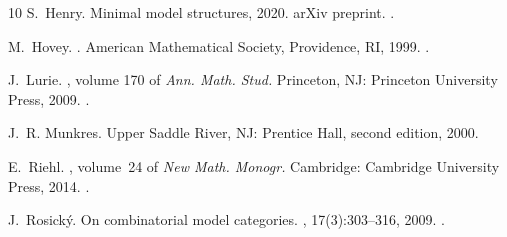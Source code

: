 \documentclass[12pt,a4paper]{amsart}
\theoremstyle{definition}
\begin{document}
\begin{thebibliography}{10}
	S.~Henry.
	\newblock Minimal model structures, 2020.
	\newblock arXiv preprint.
	\newblock \href {https://doi.org/10.48550/arXiv.2011.13408}
	{}.
	
	M.~Hovey.
	.
	\newblock American Mathematical Society, Providence, RI, 1999.
	\newblock \href {https://doi.org/10.1090/surv/063}
	{}.
	
	J.~Lurie.
	, volume 170 of {\em Ann. Math.
		Stud.}
	\newblock Princeton, NJ: Princeton University Press, 2009.
	\newblock \href {https://doi.org/10.1515/9781400830558}
	{}.
	
	J.~R. Munkres.
	\newblock Upper Saddle River, NJ: Prentice Hall, second edition, 2000.
	
	E.~Riehl.
	, volume~24 of {\em New Math.
		Monogr.}
	\newblock Cambridge: Cambridge University Press, 2014.
	\newblock \href {https://doi.org/10.1017/CBO9781107261457}
	{}.
	
	J.~Rosick{\'y}.
	\newblock On combinatorial model categories.
	, 17(3):303--316, 2009.
	\newblock \href {https://doi.org/10.1007/s10485-008-9171-2}
	{}.
	
\end{thebibliography}


%
%
\end{document}
